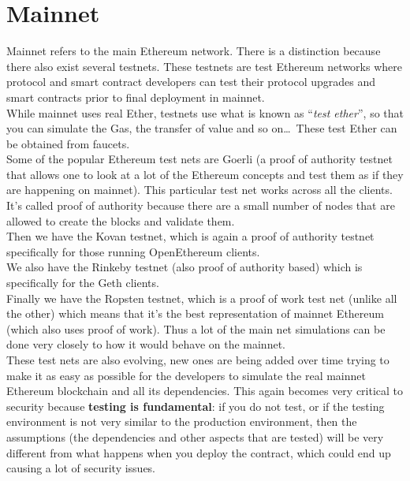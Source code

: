 \section{Mainnet} %
Mainnet refers to the main Ethereum network.
There is a distinction because there also exist several testnets.
These testnets are test Ethereum networks where protocol and smart contract developers can test their protocol upgrades and smart contracts prior to final deployment in mainnet.\\

While mainnet uses real Ether, testnets use what is known as ``\textit{test ether}'', so that you can simulate the Gas, the transfer of value and so on\dots\,
These test Ether can be obtained from faucets.\\

Some of the popular Ethereum test nets are Goerli (a proof of authority testnet that allows one to look at a lot of the Ethereum concepts and test them as if they are happening on mainnet).
This particular test net works across all the clients.
It's called proof of authority because there are a small number of nodes that are allowed to create the blocks and validate them.\\

Then we have the Kovan testnet, which is again a proof of authority testnet specifically for those running OpenEthereum clients.\\

We also have the Rinkeby testnet (also proof of authority based) which is specifically for the Geth clients.\\

Finally we have the Ropsten testnet, which is a proof of work test net (unlike all the other) which means that it's the best representation of mainnet Ethereum (which also uses proof of work).
Thus a lot of the main net simulations can be done very closely to how it would behave on the mainnet.\\

These test nets are also evolving, new ones are being added over time trying to make it as easy as possible for the developers to simulate the real mainnet Ethereum blockchain and all its dependencies.
This again becomes very critical to security because \textbf{testing is fundamental}: if you do not test, or if the testing environment is not very similar to the production environment, then the assumptions (the dependencies and other aspects that are tested) will be very different from what happens when you deploy the contract, which could end up causing a lot of security issues.

